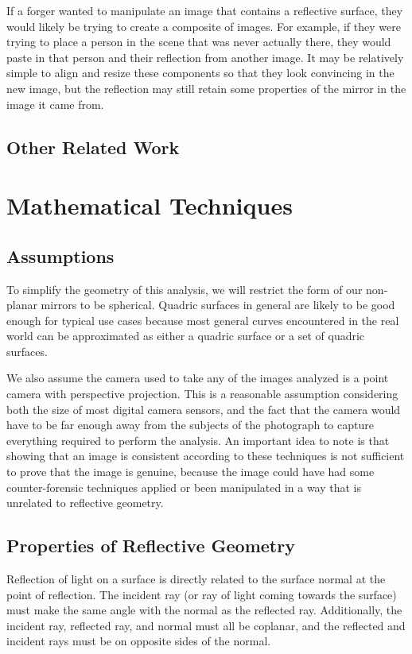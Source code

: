 \documentclass{thesis}
\begin{document}
If a forger wanted to manipulate an image that contains a reflective surface, they would likely be trying to create a composite of images. For example, if they were trying to place a person in the scene that was never actually there, they would paste in that person and their reflection from another image. It may be relatively simple to align and resize these components so that they look convincing in the new image, but the reflection may still retain some properties of the mirror in the image it came from.


\section{Other Related Work}

\chapter{Mathematical Techniques}
\section{Assumptions}
To simplify the geometry of this analysis, we will restrict the form of our non-planar mirrors to be spherical. Quadric surfaces in general are likely to be good enough for typical use cases because most general curves encountered in the real world can be approximated as either a quadric surface or a set of quadric surfaces.

We also assume the camera used to take any of the images analyzed is a point camera with perspective projection. This is a reasonable assumption considering both the size of most digital camera sensors, and the fact that the camera would have to be far enough away from the subjects of the photograph to capture everything required to perform the analysis.
An important idea to note is that showing that an image is consistent according to these techniques is not sufficient to prove that the image is genuine, because the image could have had some counter-forensic techniques applied or been manipulated in a way that is unrelated to reflective geometry.

\section{Properties of Reflective Geometry}
Reflection of light on a surface is directly related to the surface normal at the point of reflection. The incident ray (or ray of light coming towards the surface) must make the same angle with the normal as the reflected ray.  Additionally, the incident ray, reflected ray, and normal must all be coplanar, and the reflected and incident rays must be on opposite sides of the normal.
\end{document}
